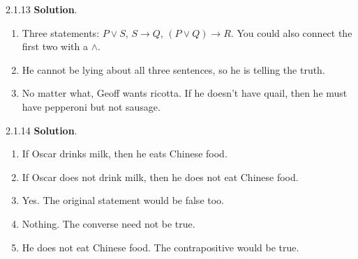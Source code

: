 \documentclass[11pt,]{book}
\theoremstyle{ptxplainnotitle}
\theoremstyle{ptxplaintitle}
\theoremstyle{ptxdefinitionnotitle}
\theoremstyle{ptxdefinitiontitle}
\theoremstyle{ptxdefinitionnotitle}
\theoremstyle{ptxdefinitiontitle}
\theoremstyle{ptxdefinitionnotitle}
\theoremstyle{ptxdefinitiontitle}
\theoremstyle{ptxdefinitiontitlenonumber}
\theoremstyle{ptxdefinitiontitlenonumber}
\numberwithin{equation}{chapter}
\newcommand{\imp}{\rightarrow}
\begin{document}
\begin{divisionexercise}{2.1.13}
\textbf{Solution}.\quad%
\leavevmode%
\begin{enumerate}[label=(\alph*)]
\item\hypertarget{li-1170}{}\hypertarget{p-2286}{}%
Three statements: \(P \vee S\), \(S \imp Q\), \((P \vee Q) \imp R\).  You could also connect the first two with a \(\wedge\).%
\item\hypertarget{li-1171}{}\hypertarget{p-2287}{}%
He cannot be lying about all three sentences, so he is telling the truth.%
\item\hypertarget{li-1172}{}\hypertarget{p-2288}{}%
No matter what, Geoff wants ricotta.  If he doesn't have quail, then he must have pepperoni but not sausage.%
\end{enumerate}
\end{divisionexercise}%
\begin{divisionexercise}{2.1.14}
\textbf{Solution}.\quad%
\leavevmode%
\begin{enumerate}[label=(\alph*)]
\item\hypertarget{li-1178}{}\hypertarget{p-2295}{}%
If Oscar drinks milk, then he eats Chinese food.%
\item\hypertarget{li-1179}{}\hypertarget{p-2296}{}%
If Oscar does not drink milk, then he does not eat Chinese food.%
\item\hypertarget{li-1180}{}\hypertarget{p-2297}{}%
Yes. The original statement would be false too.%
\item\hypertarget{li-1181}{}\hypertarget{p-2298}{}%
Nothing. The converse need not be true.%
\item\hypertarget{li-1182}{}\hypertarget{p-2299}{}%
He does not eat Chinese food. The contrapositive would be true.%
\end{enumerate}
\end{divisionexercise}%
\end{document}
